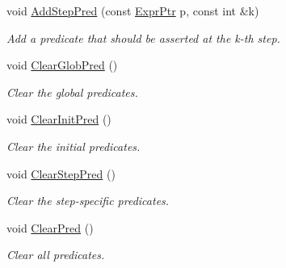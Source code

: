 \begin{DoxyCompactItemize}
void \mbox{\hyperlink{classilang_1_1_unroller_aa2f3cab7936d73eabadbf65625be0d00}{Add\+Step\+Pred}} (const \mbox{\hyperlink{namespaceilang_a7c4196c72e53ea4df4b7861af7bc3bce}{Expr\+Ptr}} p, const int \&k)
\begin{DoxyCompactList}\small\item\em Add a predicate that should be asserted at the k-\/th step. \end{DoxyCompactList}\item 
\mbox{\label{classilang_1_1_unroller_a166cde0f610fb76a0d6bbfe4b90d9f36}} 
void \mbox{\hyperlink{classilang_1_1_unroller_a166cde0f610fb76a0d6bbfe4b90d9f36}{Clear\+Glob\+Pred}} ()
\begin{DoxyCompactList}\small\item\em Clear the global predicates. \end{DoxyCompactList}\item 
\mbox{\label{classilang_1_1_unroller_abf4c6240e87465b7cb9d21158899c884}} 
void \mbox{\hyperlink{classilang_1_1_unroller_abf4c6240e87465b7cb9d21158899c884}{Clear\+Init\+Pred}} ()
\begin{DoxyCompactList}\small\item\em Clear the initial predicates. \end{DoxyCompactList}\item 
\mbox{\label{classilang_1_1_unroller_aa24c4d5c1c89fcba807661a0a7325883}} 
void \mbox{\hyperlink{classilang_1_1_unroller_aa24c4d5c1c89fcba807661a0a7325883}{Clear\+Step\+Pred}} ()
\begin{DoxyCompactList}\small\item\em Clear the step-\/specific predicates. \end{DoxyCompactList}\item 
\mbox{\label{classilang_1_1_unroller_a900edcecb45c2530f947b93859c1109c}} 
void \mbox{\hyperlink{classilang_1_1_unroller_a900edcecb45c2530f947b93859c1109c}{Clear\+Pred}} ()
\begin{DoxyCompactList}\small\item\em Clear all predicates. \end{DoxyCompactList}\item 
\mbox{\label{classilang_1_1_unroller_a4e96f5740ade5b06e715a5e19b21f049}} 

\end{DoxyCompactItemize}
